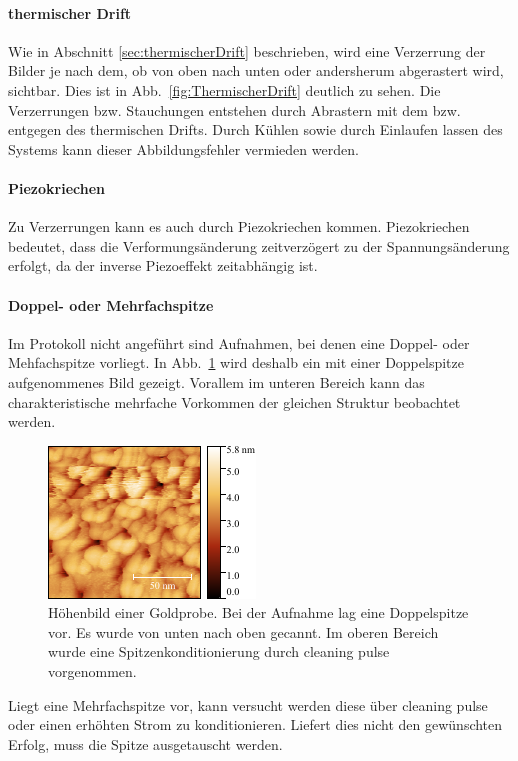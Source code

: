 \documentclass[a4paper,twoside,final]{article}
\begin{document}
\paragraph{thermischer Drift}
Wie in Abschnitt \ref{sec:thermischerDrift} beschrieben, wird eine Verzerrung der Bilder je nach dem, ob von oben nach unten oder andersherum abgerastert wird, sichtbar. Dies ist in Abb.~\ref{fig:ThermischerDrift} deutlich zu sehen. Die Verzerrungen bzw. Stauchungen entstehen durch Abrastern mit dem bzw. entgegen des thermischen Drifts. Durch Kühlen sowie durch Einlaufen lassen des Systems kann dieser Abbildungsfehler vermieden werden.

\paragraph{Piezokriechen}
Zu Verzerrungen kann es auch durch Piezokriechen kommen. Piezokriechen bedeutet, dass die Verformungsänderung zeitverzögert zu der Spannungsänderung erfolgt, da der inverse Piezoeffekt zeitabhängig ist.

\paragraph{Doppel- oder Mehrfachspitze}
Im Protokoll nicht angeführt sind Aufnahmen, bei denen eine Doppel- oder Mehfachspitze vorliegt. In Abb.~\ref{fig:Doppelspitze} wird deshalb ein mit einer Doppelspitze aufgenommenes Bild gezeigt. Vorallem im unteren Bereich kann das charakteristische mehrfache Vorkommen der gleichen Struktur beobachtet werden.

\begin{figure}
  \centering
  \includegraphics[height = 4.5 cm]{Bilder/Image02037_BeispielDoppelspitze.pdf}
  \caption{Höhenbild einer Goldprobe. Bei der Aufnahme lag eine Doppelspitze vor. Es wurde von unten nach oben gecannt. Im oberen Bereich wurde eine Spitzenkonditionierung durch cleaning pulse vorgenommen.}
  \label{fig:Doppelspitze}
\end{figure}

Liegt eine Mehrfachspitze vor, kann versucht werden diese über cleaning pulse oder einen erhöhten Strom zu konditionieren. Liefert dies nicht den gewünschten Erfolg, muss die Spitze ausgetauscht werden.
\end{document}
